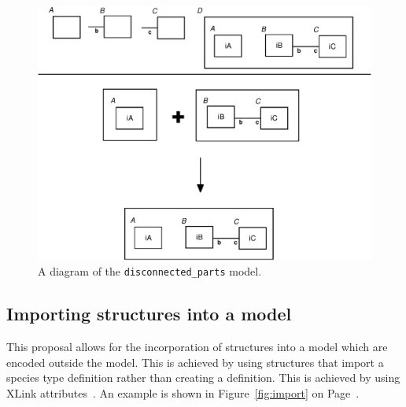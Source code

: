 \documentclass{cekarticle}
\begin{document}
\begin{figure}[h]
  \vspace*{8pt}
  \centering
  \includegraphics[scale = 0.7]{disconnected_parts.eps}
  \caption{A diagram of the \texttt{disconnected\_parts} model.}
  \label{fig:disconnected_parts}
\end{figure}

\subsection{Importing  structures into a model}
\label{sec:importing}

This proposal allows for the incorporation of 
structures into a model which are encoded outside the model. This
is achieved by using  structures that import a
species type definition rather than creating a definition.  This
is achieved by using XLink attributes~\citep{derose:2001}. An
example is shown in Figure~\ref{fig:import} on
Page~\pageref{fig:import}.
\end{document}
